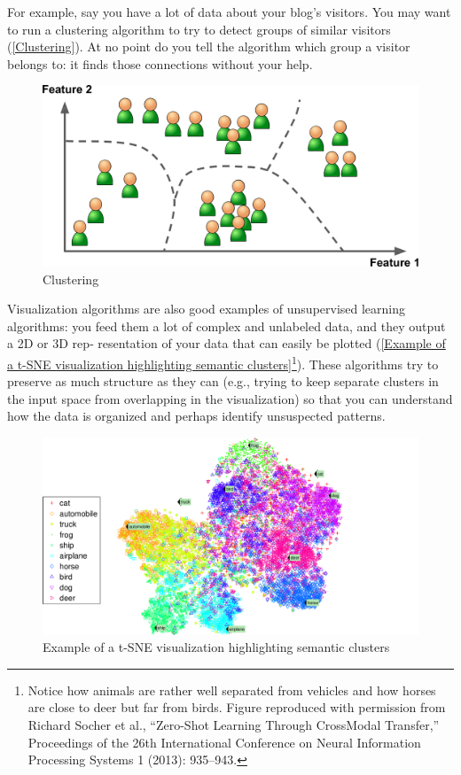 For example, say you have a lot of data about your blog’s visitors. You may want to
run a clustering algorithm to try to detect groups of similar visitors (\autoref{Clustering}). At
no point do you tell the algorithm which group a visitor belongs to: it finds those
connections without your help.
\begin{figure}
\centering
\includegraphics{img/Clustering.png}
\caption{Clustering}
\label{Clustering}
\end{figure}

Visualization algorithms are also good examples of unsupervised learning algorithms:
you feed them a lot of complex and unlabeled data, and they output a 2D or 3D rep‐
resentation of your data that can easily be plotted (\autoref{Example of a t-SNE visualization highlighting semantic clusters}\footnote{Notice how animals are rather well separated from vehicles and how horses are close to deer but far from
birds. Figure reproduced with permission from Richard Socher et al., “Zero-Shot Learning Through CrossModal Transfer,” Proceedings of the 26th International Conference on Neural Information Processing Systems 1
(2013): 935–943.}). These algorithms try
to preserve as much structure as they can (e.g., trying to keep separate clusters in the
input space from overlapping in the visualization) so that you can understand how
the data is organized and perhaps identify unsuspected patterns.
\begin{figure}
\centering
\includegraphics{img/Example of a t-SNE visualization highlighting semantic clusters.png}
\caption{Example of a t-SNE visualization highlighting semantic clusters}
\label{Example of a t-SNE visualization highlighting semantic clusters}
\end{figure}

